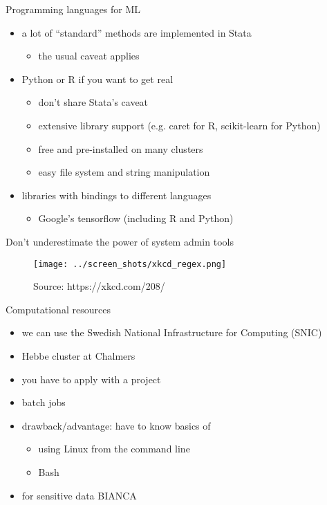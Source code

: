 \documentclass[xcolor=dvipsnames]{beamer}
\begin{document}
\begin{frame}{Programming languages for ML}
\begin{itemize}
  \item a lot of ``standard'' methods are implemented in Stata
  \begin{itemize}
    \item the usual caveat applies 
  \end{itemize}
  \pause
  \item Python or R if you want to get real
  \begin{itemize}
    \item don't share Stata's caveat
    \item extensive library support (e.g. caret for R, scikit-learn for Python)
    \item free and pre-installed on many clusters
    \item easy file system and string manipulation 
  \end{itemize}
  \pause
  \item libraries with bindings to different languages
  \begin{itemize}
    \item Google's tensorflow (including R and Python)
  \end{itemize}
  \end{itemize}
\end{frame}


\begin{frame}{Don't underestimate the power of system admin tools}
\begin{figure}
  \texttt{[image: ../screen\_shots/xkcd\_regex.png]}
   \caption{Source: https://xkcd.com/208/}
\end{figure}
\end{frame}


\begin{frame}{Computational resources}
\begin{itemize}
  \item we can use the Swedish National Infrastructure for Computing (SNIC) 
  \item Hebbe cluster at Chalmers 
  \item you have to apply with a project
  \item batch jobs
  \item drawback/advantage: have to know basics of
  \begin{itemize}
    \item using Linux from the command line
    \item Bash
  \end{itemize}
  \item for sensitive data BIANCA
\end{itemize}
\end{frame}

\appendix
\end{document}
